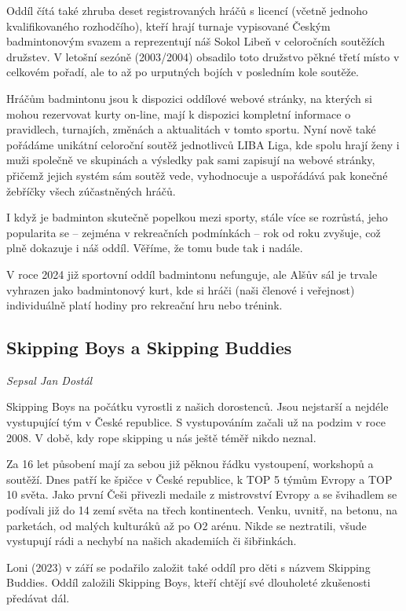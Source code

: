 Oddíl čítá také zhruba deset registrovaných hráčů s licencí (včetně
jednoho kvalifikovaného rozhodčího), kteří hrají turnaje vypisované
Českým badmintonovým svazem a reprezentují náš Sokol Libeň v celoročních
soutěžích družstev. V letošní sezóně (2003/2004) obsadilo toto družstvo
pěkné třetí místo v celkovém pořadí, ale to až po urputných bojích v
posledním kole soutěže.

Hráčům badmintonu jsou k dispozici oddílové webové stránky, na kterých
si mohou rezervovat kurty on-line, mají k dispozici kompletní informace
o pravidlech, turnajích, změnách a aktualitách v tomto sportu. Nyní nově
také pořádáme unikátní celoroční soutěž jednotlivců LIBA Liga, kde spolu
hrají ženy i muži společně ve skupinách a výsledky pak sami zapisují na
webové stránky, přičemž jejich systém sám soutěž vede, vyhodnocuje a
uspořádává pak konečné žebříčky všech zúčastněných hráčů.

I když je badminton skutečně popelkou mezi sporty, stále více se
rozrůstá, jeho popularita se -- zejména v rekreačních podmínkách -- rok
od roku zvyšuje, což plně dokazuje i náš oddíl. Věříme, že tomu bude tak
i nadále.

V roce 2024 již sportovní oddíl badmintonu nefunguje, ale Alšův sál je
trvale vyhrazen jako badmintonový kurt, kde si hráči (naši členové i
veřejnost) individuálně platí hodiny pro rekreační hru nebo trénink.

\subsection{Skipping Boys a Skipping
Buddies}\label{skipping-boys-a-skipping-buddies}

\emph{Sepsal Jan Dostál}

Skipping Boys na počátku vyrostli z našich dorostenců. Jsou nejstarší a
nejdéle vystupující tým v České republice. S vystupováním začali už na
podzim v roce 2008. V době, kdy rope skipping u nás ještě téměř nikdo
neznal.

Za 16 let působení mají za sebou již pěknou řádku vystoupení, workshopů
a soutěží. Dnes patří ke špičce v České republice, k TOP 5 týmům Evropy
a TOP 10 světa. Jako první Češi přivezli medaile z mistrovství Evropy a
se švihadlem se podívali již do 14 zemí světa na třech kontinentech.
Venku, uvnitř, na betonu, na parketách, od malých kulturáků až po O2
arénu. Nikde se neztratili, všude vystupují rádi a nechybí na našich
akademiích či šibřinkách.

Loni (2023) v září se podařilo založit také oddíl pro děti s názvem
Skipping Buddies. Oddíl založili Skipping Boys, kteří chtějí své
dlouholeté zkušenosti předávat dál.

